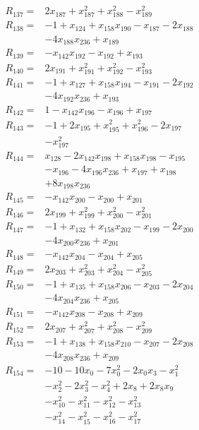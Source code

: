 \begin{align*}
R_{137}={}&2x_{187} +x_{187}^{2} +x_{188}^{2} -x_{189}^{2}\\[3pt]
R_{138}={}&-1 +x_{124} +x_{158}x_{190} -x_{187} -2x_{188}\\
&-4x_{188}x_{236} +x_{189}\\[3pt]
R_{139}={}&-x_{142}x_{192} -x_{192} +x_{193}\\[3pt]
R_{140}={}&2x_{191} +x_{191}^{2} +x_{192}^{2} -x_{193}^{2}\\[3pt]
R_{141}={}&-1 +x_{127} +x_{158}x_{194} -x_{191} -2x_{192}\\
&-4x_{192}x_{236} +x_{193}\\[3pt]
R_{142}={}&1 -x_{142}x_{196} -x_{196} +x_{197}\\[3pt]
R_{143}={}&-1 +2x_{195} +x_{195}^{2} +x_{196}^{2} -2x_{197}\\
&-x_{197}^{2}\\[3pt]
R_{144}={}&x_{128} -2x_{142}x_{198} +x_{158}x_{198} -x_{195}\\
&-x_{196} -4x_{196}x_{236} +x_{197} +x_{198}\\
&+8x_{198}x_{236}\\[3pt]
R_{145}={}&-x_{142}x_{200} -x_{200} +x_{201}\\[3pt]
R_{146}={}&2x_{199} +x_{199}^{2} +x_{200}^{2} -x_{201}^{2}\\[3pt]
R_{147}={}&-1 +x_{132} +x_{158}x_{202} -x_{199} -2x_{200}\\
&-4x_{200}x_{236} +x_{201}\\[3pt]
R_{148}={}&-x_{142}x_{204} -x_{204} +x_{205}\\[3pt]
R_{149}={}&2x_{203} +x_{203}^{2} +x_{204}^{2} -x_{205}^{2}\\[3pt]
R_{150}={}&-1 +x_{135} +x_{158}x_{206} -x_{203} -2x_{204}\\
&-4x_{204}x_{236} +x_{205}\\[3pt]
R_{151}={}&-x_{142}x_{208} -x_{208} +x_{209}\\[3pt]
R_{152}={}&2x_{207} +x_{207}^{2} +x_{208}^{2} -x_{209}^{2}\\[3pt]
R_{153}={}&-1 +x_{138} +x_{158}x_{210} -x_{207} -2x_{208}\\
&-4x_{208}x_{236} +x_{209}\\[3pt]
R_{154}={}&-10 -10x_{0} -7x_{0}^{2} -2x_{0}x_{3} -x_{1}^{2}\\
&-x_{2}^{2} -2x_{3}^{2} -x_{4}^{2} +2x_{8} +2x_{8}x_{9}\\
&-x_{10}^{2} -x_{11}^{2} -x_{12}^{2} -x_{13}^{2}\\
&-x_{14}^{2} -x_{15}^{2} -x_{16}^{2} -x_{17}^{2}\\

\end{align*}
